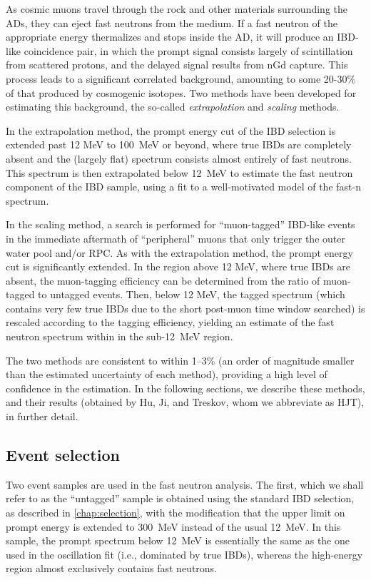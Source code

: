 \documentclass[../thesis.tex]{subfiles}
\begin{document}
As cosmic muons travel through the rock and other materials surrounding the ADs, they can eject fast neutrons from the medium. If a fast neutron of the appropriate energy thermalizes and stops inside the AD, it will produce an IBD-like coincidence pair, in which the prompt signal consists largely of scintillation from scattered protons, and the delayed signal results from nGd capture. This process leads to a significant correlated background, amounting to some 20-30\% of that produced by cosmogenic isotopes. Two methods have been developed for estimating this background, the so-called \emph{extrapolation} and \emph{scaling} methods.

In the extrapolation method, the prompt energy cut of the IBD selection is extended past 12 MeV to 100~MeV or beyond, where true IBDs are completely absent and the (largely flat) spectrum consists almost entirely of fast neutrons. This spectrum is then extrapolated below 12~MeV to estimate the fast neutron component of the IBD sample, using a fit to a well-motivated model of the fast-n spectrum.

In the scaling method, a search is performed for ``muon-tagged'' IBD-like events in the immediate aftermath of ``peripheral'' muons that only trigger the outer water pool and/or RPC. As with the extrapolation method, the prompt energy cut is significantly extended. In the region above 12 MeV, where true IBDs are absent, the muon-tagging efficiency can be determined from the ratio of muon-tagged to untagged events. Then, below 12 MeV, the tagged spectrum (which contains very few true IBDs due to the short post-muon time window searched) is rescaled according to the tagging efficiency, yielding an estimate of the fast neutron spectrum within in the sub-12~MeV region.

The two methods are consistent to within 1--3\% (an order of magnitude smaller than the estimated uncertainty of each method), providing a high level of confidence in the estimation. In the following sections, we describe these methods, and their results (obtained by Hu, Ji, and Treskov, whom we abbreviate as HJT), in further detail.

\subsection{Event selection}
\label{sec:fastn_sel}

Two event samples are used in the fast neutron analysis. The first, which we shall refer to as the ``untagged'' sample is obtained using the standard IBD selection, as described in \autoref{chap:selection}, with the modification that the upper limit on prompt energy is extended to 300~MeV instead of the usual 12~MeV. In this sample, the prompt spectrum below 12~MeV is essentially the same as the one used in the oscillation fit (i.e., dominated by true IBDs), whereas the high-energy region almost exclusively contains fast neutrons.
\end{document}
